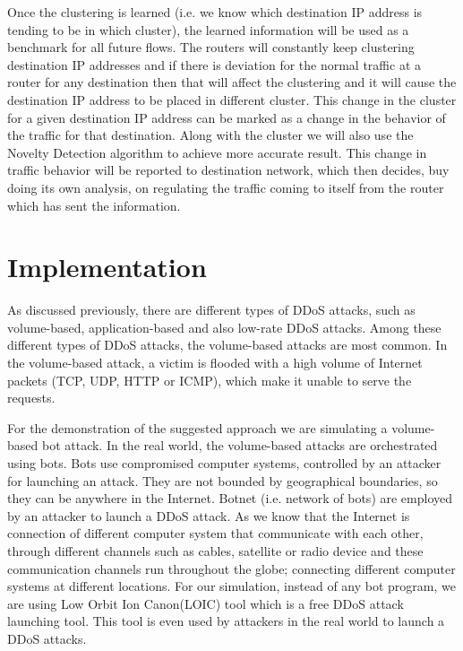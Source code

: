 \documentclass[12pt,oneside,a4paper]{article}
\begin{document}
Once the clustering is learned (i.e. we know which destination IP address is tending to be in which cluster), the learned information will be used as a benchmark for all future flows. The routers will constantly keep clustering destination IP addresses and if there is deviation for the normal traffic at a router for any destination then that will affect the clustering and it will cause the destination IP address to be placed in different cluster. This change in the cluster for a given destination IP address can be marked as a change in the behavior of the traffic for that destination. Along with the cluster we will also use the Novelty Detection algorithm to achieve more accurate result. This change in traffic behavior will be reported to destination network, which then decides, buy doing its own analysis, on regulating the traffic coming to itself from the router which has sent the information.
\pagebreak

\section{Implementation} \label{sec:Implementation}

As discussed previously, there are different types of DDoS attacks, such as volume-based, application-based and also low-rate DDoS attacks. Among these different types of DDoS attacks, the volume-based attacks are most common. In the volume-based attack, a victim is flooded with a high volume of Internet packets (TCP, UDP, HTTP or ICMP), which make it unable to serve the requests.

For the demonstration of the suggested approach we are simulating a volume-based bot attack. In the real world, the volume-based attacks are orchestrated using bots. Bots use compromised computer systems, controlled by an attacker for launching an attack. They are not bounded by geographical boundaries, so they can be anywhere in the Internet. Botnet (i.e. network of bots) are employed by an attacker to launch a DDoS attack. As we know that the Internet is connection of different computer system that communicate with each other, through different channels such as cables, satellite or radio device and these communication channels run throughout the globe; connecting different computer systems at different locations. For our simulation, instead of any bot program, we are using Low Orbit Ion Canon(LOIC) tool which is a free DDoS attack launching tool. This tool is even used by attackers in the real world to launch a DDoS attacks.
\end{document}
